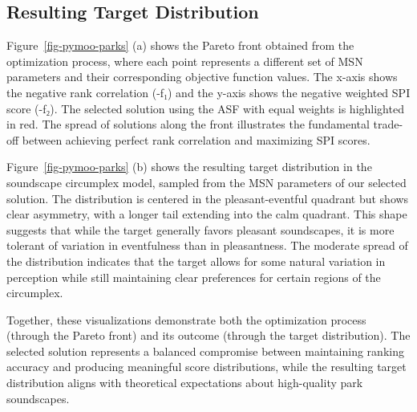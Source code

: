 \documentclass[
  authoryear,
  preprint,
  3p]{elsarticle}
\begin{document}
\subsection{Resulting Target
Distribution}\label{resulting-target-distribution}

Figure~\ref{fig-pymoo-parks} (a) shows the Pareto front obtained from
the optimization process, where each point represents a different set of
MSN parameters and their corresponding objective function values. The
x-axis shows the negative rank correlation (-f₁) and the y-axis shows
the negative weighted SPI score (-f₂). The selected solution using the
ASF with equal weights is highlighted in red. The spread of solutions
along the front illustrates the fundamental trade-off between achieving
perfect rank correlation and maximizing SPI scores.

Figure~\ref{fig-pymoo-parks} (b) shows the resulting target distribution
in the soundscape circumplex model, sampled from the MSN parameters of
our selected solution. The distribution is centered in the
pleasant-eventful quadrant but shows clear asymmetry, with a longer tail
extending into the calm quadrant. This shape suggests that while the
target generally favors pleasant soundscapes, it is more tolerant of
variation in eventfulness than in pleasantness. The moderate spread of
the distribution indicates that the target allows for some natural
variation in perception while still maintaining clear preferences for
certain regions of the circumplex.

Together, these visualizations demonstrate both the optimization process
(through the Pareto front) and its outcome (through the target
distribution). The selected solution represents a balanced compromise
between maintaining ranking accuracy and producing meaningful score
distributions, while the resulting target distribution aligns with
theoretical expectations about high-quality park soundscapes.
\end{document}
